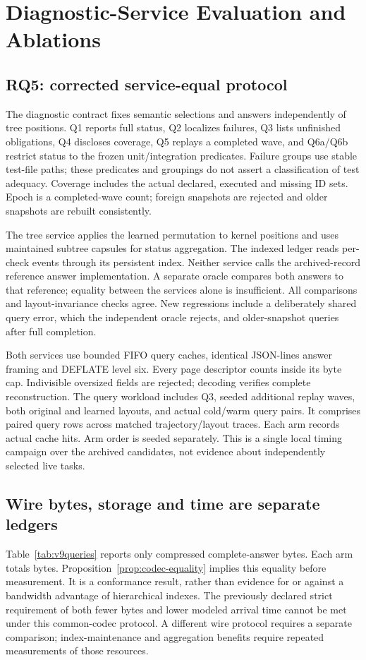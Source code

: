 \section{Diagnostic-Service Evaluation and Ablations}\label{sec:v8evaluation}
\subsection{RQ5: corrected service-equal protocol}\label{sec:v8service}
The diagnostic contract fixes semantic selections and answers independently
of tree positions. Q1 reports full status, Q2 localizes failures, Q3 lists
unfinished obligations, Q4 discloses coverage, Q5 replays a completed wave,
and Q6a/Q6b restrict status to the frozen unit/integration predicates. Failure
groups use stable test-file paths; these predicates and groupings do not
assert a classification of test adequacy. Coverage includes the actual
declared, executed and missing ID sets. Epoch is a completed-wave count;
foreign snapshots are rejected and older snapshots are rebuilt consistently.

The tree service applies the learned permutation to kernel positions and
uses maintained subtree capsules for status aggregation. The indexed ledger
reads per-check events through its persistent index. Neither service calls
the archived-record reference answer implementation. A separate oracle
compares both answers to that reference; equality between the services alone
is insufficient. All \VnineOracleMatches{} comparisons and
\VnineInvariantChecks{} layout-invariance checks agree. New regressions
include a deliberately shared query error, which the independent oracle
rejects, and older-snapshot queries after full completion.

Both services use bounded FIFO query caches, identical JSON-lines answer
framing and DEFLATE level six. Every page descriptor counts inside its byte
cap. Indivisible oversized fields are rejected; decoding verifies complete
reconstruction. The query workload includes Q3, seeded additional replay
waves, both original and learned layouts, and actual cold/warm query pairs.
It comprises \VnineStudyRows{} paired query rows across \VnineSetups{} matched
trajectory/layout traces. Each arm records \VnineCacheHits{} actual cache hits.
Arm order is seeded separately. This is a single local timing campaign over
the archived candidates, not evidence about independently selected live tasks.

\subsection{Wire bytes, storage and time are separate ledgers}
Table~\ref{tab:v9queries} reports only compressed complete-answer bytes.
Each arm totals \VnineWireBytes{} bytes. Proposition~\ref{prop:codec-equality}
implies this equality before measurement. It is a conformance result, rather
than evidence for or against a bandwidth advantage of hierarchical indexes.
The previously declared strict requirement of both fewer bytes and lower
modeled arrival time cannot be met under this common-codec protocol.
A different wire protocol requires a separate comparison; index-maintenance
and aggregation benefits require repeated measurements of those resources.

